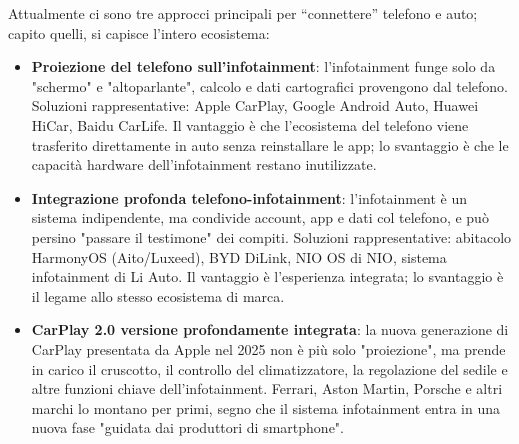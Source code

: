 


Attualmente ci sono tre approcci principali per “connettere” telefono e auto; capito quelli, si capisce l'intero ecosistema:

\begin{itemize}
  \item \textbf{Proiezione del telefono sull'infotainment}: l'infotainment funge solo da "schermo" e "altoparlante", calcolo e dati cartografici provengono dal telefono. Soluzioni rappresentative: Apple CarPlay, Google Android Auto, Huawei HiCar, Baidu CarLife. Il vantaggio è che l'ecosistema del telefono viene trasferito direttamente in auto senza reinstallare le app; lo svantaggio è che le capacità hardware dell'infotainment restano inutilizzate.
  \item \textbf{Integrazione profonda telefono-infotainment}: l'infotainment è un sistema indipendente, ma condivide account, app e dati col telefono, e può persino "passare il testimone" dei compiti. Soluzioni rappresentative: abitacolo HarmonyOS (Aito/Luxeed), BYD DiLink, NIO OS di NIO, sistema infotainment di Li Auto. Il vantaggio è l'esperienza integrata; lo svantaggio è il legame allo stesso ecosistema di marca.
  \item \textbf{CarPlay 2.0 versione profondamente integrata}: la nuova generazione di CarPlay presentata da Apple nel 2025 non è più solo "proiezione", ma prende in carico il cruscotto, il controllo del climatizzatore, la regolazione del sedile e altre funzioni chiave dell'infotainment. Ferrari, Aston Martin, Porsche e altri marchi lo montano per primi, segno che il sistema infotainment entra in una nuova fase "guidata dai produttori di smartphone".
\end{itemize}


